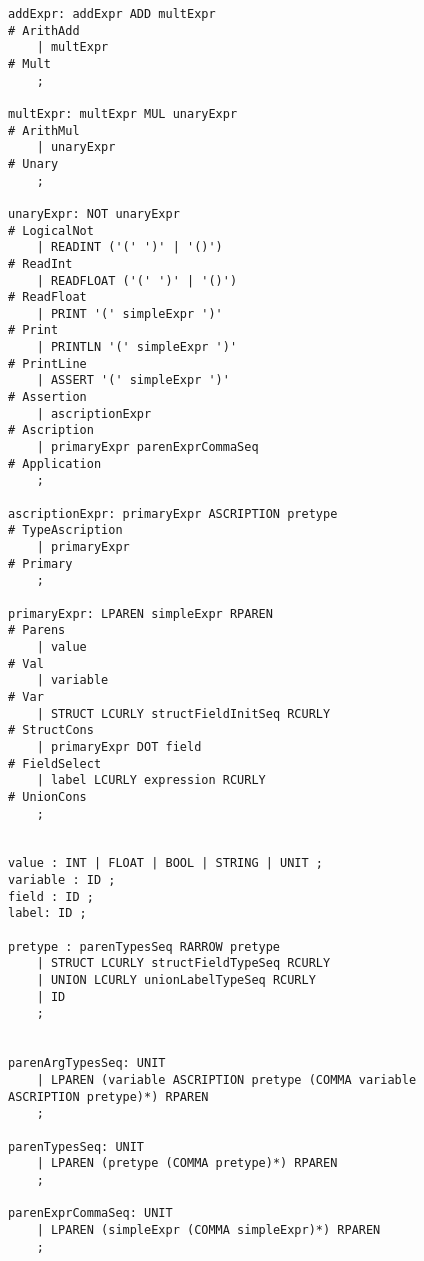 \begin{figure}[H]
\begin{lstlisting}
addExpr: addExpr ADD multExpr                                             # ArithAdd
    | multExpr                                                            # Mult
    ;

multExpr: multExpr MUL unaryExpr                                          # ArithMul
    | unaryExpr                                                           # Unary
    ;

unaryExpr: NOT unaryExpr                                                  # LogicalNot
    | READINT ('(' ')' | '()')                                            # ReadInt
    | READFLOAT ('(' ')' | '()')                                          # ReadFloat
    | PRINT '(' simpleExpr ')'                                            # Print
    | PRINTLN '(' simpleExpr ')'                                          # PrintLine
    | ASSERT '(' simpleExpr ')'                                           # Assertion
    | ascriptionExpr                                                      # Ascription
    | primaryExpr parenExprCommaSeq                                       # Application
    ;

ascriptionExpr: primaryExpr ASCRIPTION pretype                            # TypeAscription
    | primaryExpr                                                         # Primary
    ;

primaryExpr: LPAREN simpleExpr RPAREN                                     # Parens
    | value                                                               # Val
    | variable                                                            # Var
    | STRUCT LCURLY structFieldInitSeq RCURLY                             # StructCons
    | primaryExpr DOT field                                               # FieldSelect
    | label LCURLY expression RCURLY                                      # UnionCons
    ;


value : INT | FLOAT | BOOL | STRING | UNIT ;
variable : ID ;
field : ID ;
label: ID ;

pretype : parenTypesSeq RARROW pretype
    | STRUCT LCURLY structFieldTypeSeq RCURLY
    | UNION LCURLY unionLabelTypeSeq RCURLY
    | ID
    ;


parenArgTypesSeq: UNIT
    | LPAREN (variable ASCRIPTION pretype (COMMA variable ASCRIPTION pretype)*) RPAREN
    ;

parenTypesSeq: UNIT
    | LPAREN (pretype (COMMA pretype)*) RPAREN
    ;

parenExprCommaSeq: UNIT
    | LPAREN (simpleExpr (COMMA simpleExpr)*) RPAREN
    ;


\end{lstlisting}
\end{figure}
